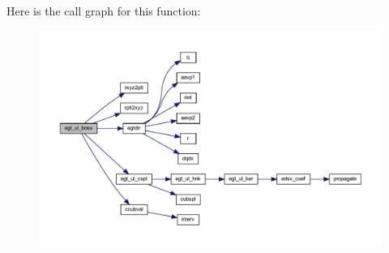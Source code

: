 Here is the call graph for this function\+:\nopagebreak
\begin{figure}[H]
\begin{center}
\leavevmode
\includegraphics[width=350pt]{Leroi__c_8f90_a9074cfabdfb82294ca3b8541c14a9099_cgraph}
\end{center}
\end{figure}
\mbox{\label{Leroi__c_8f90_a55b57146ea180fed3080a010421620fe}} 
